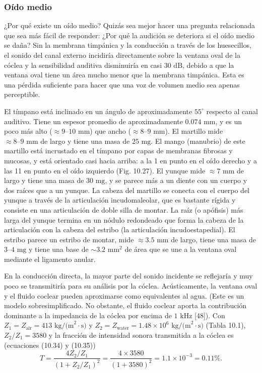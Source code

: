 \documentclass[12pt]{book}
\begin{document}
\subsubsection*{Oído medio}

¿Por qué existe un oído medio? Quizás sea mejor hacer una pregunta relacionada que sea más fácil de responder: ¿Por qué la audición se deteriora si el oído medio se daña? Sin la membrana timpánica y la conducción a través de los huesecillos, el sonido del canal externo incidiría directamente sobre la ventana oval de la cóclea y la sensibilidad auditiva disminuiría en casi $30\text{ dB}$, debido a que la ventana oval tiene un área mucho menor que la membrana timpánica. Esta es una pérdida suficiente para hacer que una voz de volumen medio sea apenas perceptible.

El tímpano está inclinado en un ángulo de aproximadamente $55^{\circ}$ respecto al canal auditivo. Tiene un espesor promedio de aproximadamente $0.074\text{ mm}$, y es un poco más alto ($\approx 9\text{--}10\text{ mm}$) que ancho ($\approx 8\text{--}9\text{ mm}$). El martillo mide $\approx 8\text{--}9\text{ mm}$ de largo y tiene una masa de $25\text{ mg}$. El mango (manubrio) de este martillo está incrustado en el tímpano por capas de membranas fibrosas y mucosas, y está orientado casi hacia arriba: a la 1 en punto en el oído derecho y a las 11 en punto en el oído izquierdo (Fig. 10.27). El yunque mide $\approx 7\text{ mm}$ de largo y tiene una masa de $30\text{ mg}$, y se parece más a un diente con un cuerpo y dos raíces que a un yunque. La cabeza del martillo se conecta con el cuerpo del yunque a través de la articulación incudomaleolar, que es bastante rígida y consiste en una articulación de doble silla de montar. La raíz (o apófisis) más larga del yunque termina en un nódulo redondeado que forma la cabeza de la articulación con la cabeza del estribo (la articulación incudoestapedial). El estribo parece un estribo de montar, mide $\approx 3.5\text{ mm}$ de largo, tiene una masa de $3\text{--}4\text{ mg}$ y tiene una base de $\sim 3.2\text{ mm}^2$ de área que se une a la ventana oval mediante el ligamento anular.

En la conducción directa, la mayor parte del sonido incidente se reflejaría y muy poco se transmitiría para su análisis por la cóclea. Acústicamente, la ventana oval y el fluido coclear pueden aproximarse como equivalentes al agua. (Este es un modelo sobresimplificado. No obstante, el fluido coclear aporta la contribución dominante a la impedancia de la cóclea por encima de $1\text{ kHz}$ [48]). Con $Z_1 = Z_{\text{air}} = 413\text{ kg/(m}^2\cdot\text{s)}$ y $Z_2 = Z_{\text{water}} = 1.48 \times 10^6\text{ kg/(m}^2\cdot\text{s)}$ (Tabla 10.1), $Z_2/Z_1 = 3580$ y la fracción de intensidad sonora transmitida a la cóclea es (ecuaciones (10.34) y (10.35))
\begin{equation}
T = \frac{4 Z_2 / Z_1}{(1 + Z_2 / Z_1)^2} = \frac{4 \times 3580}{(1 + 3580)^2} = 1.1 \times 10^{-3} = 0.11\%.
\label{eq:10.52}
\end{equation}
\end{document}

